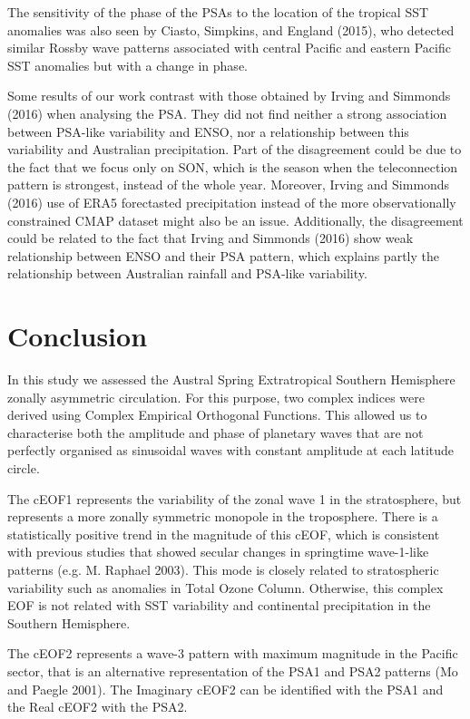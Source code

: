 \documentclass[smallextended]{svjour3}       %
\begin{document}
The sensitivity of the phase of the PSAs to the location of the tropical SST anomalies was also seen by Ciasto, Simpkins, and England (2015), who detected similar Rossby wave patterns associated with central Pacific and eastern Pacific SST anomalies but with a change in phase.

Some results of our work contrast with those obtained by Irving and Simmonds (2016) when analysing the PSA.
They did not find neither a strong association between PSA-like variability and ENSO, nor a relationship between this variability and Australian precipitation.
Part of the disagreement could be due to the fact that we focus only on SON, which is the season when the teleconnection pattern is strongest, instead of the whole year.
Moreover, Irving and Simmonds (2016) use of ERA5 forectasted precipitation instead of the more observationally constrained CMAP dataset might also be an issue.
Additionally, the disagreement could be related to the fact that Irving and Simmonds (2016) show weak relationship between ENSO and their PSA pattern, which explains partly the relationship between Australian rainfall and PSA-like variability.

\hypertarget{conclusion}{%
\section{Conclusion}\label{conclusion}}

In this study we assessed the Austral Spring Extratropical Southern Hemisphere zonally asymmetric circulation.
For this purpose, two complex indices were derived using Complex Empirical Orthogonal Functions.
This allowed us to characterise both the amplitude and phase of planetary waves that are not perfectly organised as sinusoidal waves with constant amplitude at each latitude circle.

The cEOF1 represents the variability of the zonal wave 1 in the stratosphere, but represents a more zonally symmetric monopole in the troposphere.
There is a statistically positive trend in the magnitude of this cEOF, which is consistent with previous studies that showed secular changes in springtime wave-1-like patterns (e.g. M. Raphael 2003).
This mode is closely related to stratospheric variability such as anomalies in Total Ozone Column.
Otherwise, this complex EOF is not related with SST variability and continental precipitation in the Southern Hemisphere.

The cEOF2 represents a wave-3 pattern with maximum magnitude in the Pacific sector, that is an alternative representation of the PSA1 and PSA2 patterns (Mo and Paegle 2001).
The Imaginary cEOF2 can be identified with the PSA1 and the Real cEOF2 with the PSA2.
\end{document}

